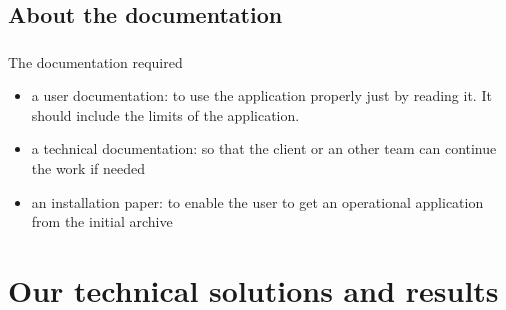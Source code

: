\documentclass{beamer}
\begin{document}
\subsection{About the documentation}
\begin{frame}
	\frametitle{}
	 \begin{block}{The documentation required}
		\begin{itemize}
			\item a user documentation: to use the application properly just by reading it. It should include the limits of the application.
			\item a technical documentation: so that the client or an other team can continue the work if needed
			\item an installation paper: to enable the user to get an operational application from the initial archive
		\end{itemize}
    \end{block}    

\end{frame}

\section{Our technical solutions and results}
\end{document}
